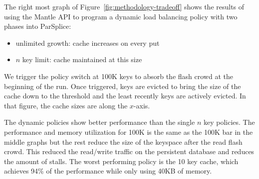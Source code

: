 %
%

The right most graph of Figure~\ref{fig:methodology-tradeoff} shows the results
of using the Mantle API to program  a dynamic load balancing policy with two
phases into ParSplice:

\begin{itemize}
  \item unlimited growth: cache increases on every put
  \item \(n\) key limit: cache maintained at this size
\end{itemize}

We trigger the policy switch at 100K keys to absorb the flash crowd at the
beginning of the run. Once triggered, keys are evicted to bring the size of the
cache down to the threshold and the least recently keys are actively evicted.
In that figure, the cache sizes are along the \(x\)-axis.

The dynamic policies show better performance than the single \(n\) key
policies. The performance and memory utilization for 100K is the same as the
100K bar in the middle graphs but the rest reduce the size of the keyspace
after the read flash crowd. This reduced the read/write traffic on the
persistent database and reduces the amount of stalls.  The worst performing
policy is the 10 key cache, which achieves 94\% of the performance while only
using 40KB of memory. 

